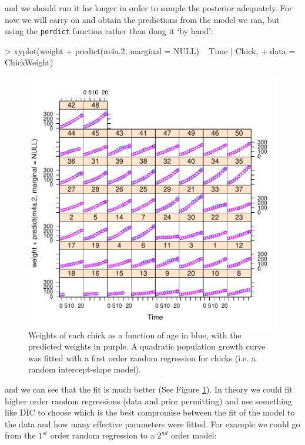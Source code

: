\documentclass{article}
\begin{document}
and we should run it for longer in order to sample the posterior adequately. For now we will carry on and obtain the predictions from the model we ran, but using the \texttt{perdict} function rather than dong it `by hand': 

\begin{Schunk}
\begin{Sinput}
> xyplot(weight + predict(m4a.2, marginal = NULL) ~ Time | Chick, 
+     data = ChickWeight)
\end{Sinput}
\end{Schunk}


\begin{figure}[!h]
\begin{center}
\includegraphics{Lecture4-022}
\end{center}
\caption{Weights of each chick as a function of age in blue, with the predicted weights in purple. A quadratic population growth curve was fitted with a first order random regression for chicks (i.e. a random intercept-slope model).}
\label{CWpred.2-fig}
\end{figure}

and we can see that the fit is much better (See Figure \ref{CWpred.2-fig}). In theory we could fit higher order random regressions (data and prior permitting) and use something like DIC to choose which is the best compromise between the fit of the model to the data and how many effective parameters were fitted. For example we could go from the $1^{st}$ order random regression to a $2^{nd}$ order model: 
\end{document}
